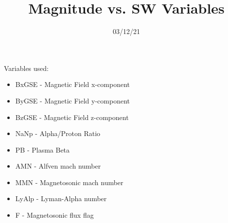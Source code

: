 \documentclass[12pt]{article}
\title{Magnitude vs. SW Variables}
\date{03/12/21}
\begin{document}
\maketitle
\begin{large}
Variables used:

\begin{itemize}
  \item BxGSE - Magnetic Field x-component
  \item ByGSE - Magnetic Field y-component
  \item BzGSE - Magnetic Field z-component
  \item NaNp - Alpha/Proton Ratio
  \item PB - Plasma Beta
  \item AMN - Alfven mach number
  \item MMN - Magnetosonic mach number
  \item LyAlp - Lyman-Alpha number
  \item F - Magnetosonic flux flag
\end{itemize}
\end{large}

\graphicspath{{../plots/03_12/}}


\newpage
\end{document}
